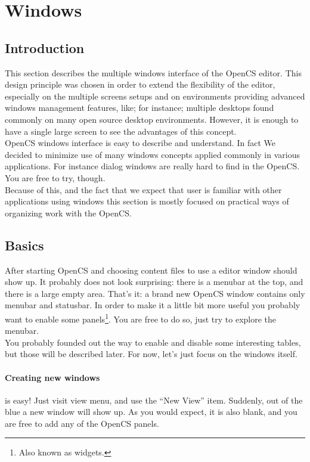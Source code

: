\section{Windows}
\subsection{Introduction}
This section describes the multiple windows interface of the OpenCS editor. This design principle was chosen in order to extend the flexibility of the editor, especially on the multiple screens setups and on environments providing advanced windows management features, like; for instance; multiple desktops found commonly on many open source desktop environments. However, it is enough to have a single large screen to see the advantages of this concept.\\
OpenCS windows interface is easy to describe and understand. In fact We decided to minimize use of many windows concepts applied commonly in various applications. For instance dialog windows are really hard to find in the OpenCS. You are free to try, though.\\
Because of this, and the fact that we expect that user is familiar with other applications using windows this section is mostly focused on practical ways of organizing work with the OpenCS.

\subsection{Basics}
After starting Open{CS} and choosing content files to use a editor window should show up. It probably does not look surprising: there is a menubar at the top, and there is a large empty area. That's it: a brand new Open{CS} window contains only menubar and statusbar. In order to make it a little bit more useful you probably want to enable some panels\footnote{Also known as widgets.}. You are free to do so, just try to explore the menubar. \\
You probably founded out the way to enable and disable some interesting tables, but those will be described later. For now, let's just focus on the windows itself.

\paragraph{Creating new windows}
is easy! Just visit view menu, and use the ``New View'' item. Suddenly, out of the blue a new window will show up. As you would expect, it is also blank, and you are free to add any of the Open{CS} panels.

